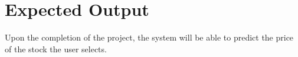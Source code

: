 \section{Expected Output}
\vspace{-18pt}
Upon the completion of the project, the system will be able to predict the price of the stock the user selects.
\renewcommand\bibname{REFERENCES} %

